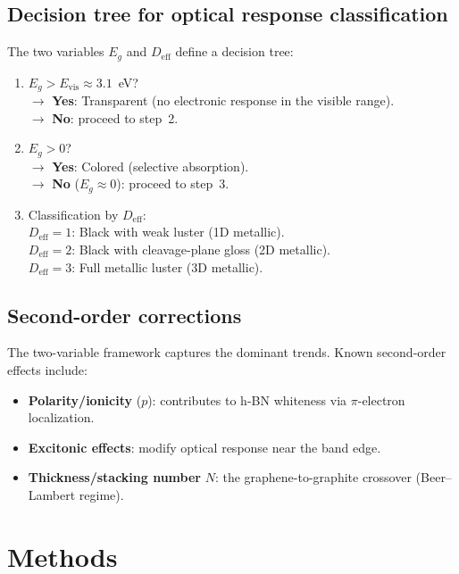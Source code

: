 \documentclass[twocolumn,showpacs,preprintnumbers,amsmath,amssymb,prb]{revtex4-2}
\begin{document}
\subsection{Decision tree for optical response classification}
\label{sec:tree}

The two variables $E_g$ and $D_\mathrm{eff}$ define a decision tree:

\begin{enumerate}
  \item $E_g > E_\mathrm{vis} \approx 3.1$~eV? \\
    $\to$ \textbf{Yes}: Transparent (no electronic response in the
    visible range). \\
    $\to$ \textbf{No}: proceed to step~2.
  \item $E_g > 0$? \\
    $\to$ \textbf{Yes}: Colored (selective absorption). \\
    $\to$ \textbf{No} ($E_g \approx 0$): proceed to step~3.
  \item Classification by $D_\mathrm{eff}$: \\
    $D_\mathrm{eff} = 1$: Black with weak luster (1D metallic). \\
    $D_\mathrm{eff} = 2$: Black with cleavage-plane gloss (2D metallic). \\
    $D_\mathrm{eff} = 3$: Full metallic luster (3D metallic).
\end{enumerate}

\subsection{Second-order corrections}

The two-variable framework captures the dominant trends. Known
second-order effects include:
\begin{itemize}
  \item \textbf{Polarity/ionicity} ($p$): contributes to h-BN whiteness
    via $\pi$-electron localization.
  \item \textbf{Excitonic effects}: modify optical response near the
    band edge.
  \item \textbf{Thickness/stacking number} $N$: the graphene-to-graphite
    crossover (Beer--Lambert regime).
\end{itemize}

\section{Methods}
\label{sec:methods}
\end{document}
